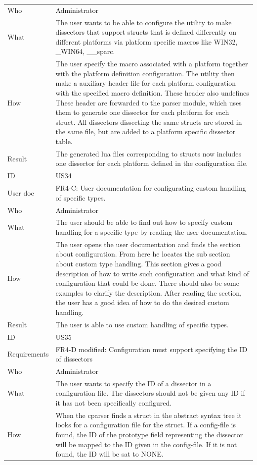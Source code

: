 \begin{table}[htbp]
{\begin{tabularx}{1.2\textwidth}{l X}
	Who & Administrator \\
	What & The user wants to be able to configure the utility to make dissectors that support structs that is defined differently on different 			platforms via platform specific macros like WIN32, \_WIN64, \_\_sparc. \\
	How & The user specify the macro associated with a platform together with the platform definition configuration. The utility then make a 			auxiliary header file for each platform configuration with the specified macro definition. These header also undefines  These header are 			forwarded to the parser module, which uses them to generate one dissector for each platform for each struct. All dissectors dissecting the 			same structs are stored in the same file, but are added to a platform specific dissector table. \\
	Result & The generated lua files corresponding to structs now includes one dissector for each platform defined in the configuration file. \\
	\midrule
	ID & US34 \\
	User doc & FR4-C: User documentation for configurating custom handling of specific types. \\
	Who & Administrator \\
	What & The user should be able to find out how to specify custom handling for a specific type by reading the user documentation. \\
	How &	 The user opens the user documentation and finds the section about configuration. From here he locates the sub section about 			custom type handling. This section gives a good description of how to write such configuration and what kind of configuration that could be 			done. There should also be some examples to clarify the description. After reading the section, the user has a good idea of how to do the 			desired custom handling. \\ 
	Result & The user is able to use custom handling of specific types. \\
	\midrule
	ID & US35 \\
	Requirements & FR4-D modified: Configuration must support specifying the ID of dissectors \\
	Who & Administrator \\
	What & The user wants to specify the ID of a dissector in a configuration file. The dissectors should not be given any ID if it has not been 			specifically configured. \\
	How & When the cparser finds a struct in the abstract syntax tree it looks for a configuration file for the struct. If a config-file is found, the 			ID of the prototype field representing the dissector will be mapped to the ID given in the config-file.  If it is not found, the ID will be sat to 			NONE. \\

\end{tabularx}}
\end{table}
